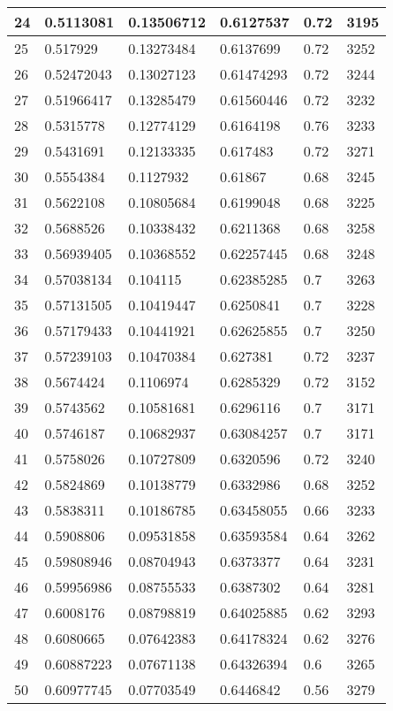 \begin{longtable}{|l|l|l|l|l|l|}
24 & 0.5113081 & 0.13506712 & 0.6127537 & 0.72 & 3195 \\ \hline 
25 & 0.517929 & 0.13273484 & 0.6137699 & 0.72 & 3252 \\ \hline 
26 & 0.52472043 & 0.13027123 & 0.61474293 & 0.72 & 3244 \\ \hline 
27 & 0.51966417 & 0.13285479 & 0.61560446 & 0.72 & 3232 \\ \hline 
28 & 0.5315778 & 0.12774129 & 0.6164198 & 0.76 & 3233 \\ \hline 
29 & 0.5431691 & 0.12133335 & 0.617483 & 0.72 & 3271 \\ \hline 
30 & 0.5554384 & 0.1127932 & 0.61867 & 0.68 & 3245 \\ \hline 
31 & 0.5622108 & 0.10805684 & 0.6199048 & 0.68 & 3225 \\ \hline 
32 & 0.5688526 & 0.10338432 & 0.6211368 & 0.68 & 3258 \\ \hline 
33 & 0.56939405 & 0.10368552 & 0.62257445 & 0.68 & 3248 \\ \hline 
34 & 0.57038134 & 0.104115 & 0.62385285 & 0.7 & 3263 \\ \hline 
35 & 0.57131505 & 0.10419447 & 0.6250841 & 0.7 & 3228 \\ \hline 
36 & 0.57179433 & 0.10441921 & 0.62625855 & 0.7 & 3250 \\ \hline 
37 & 0.57239103 & 0.10470384 & 0.627381 & 0.72 & 3237 \\ \hline 
38 & 0.5674424 & 0.1106974 & 0.6285329 & 0.72 & 3152 \\ \hline 
39 & 0.5743562 & 0.10581681 & 0.6296116 & 0.7 & 3171 \\ \hline 
40 & 0.5746187 & 0.10682937 & 0.63084257 & 0.7 & 3171 \\ \hline 
41 & 0.5758026 & 0.10727809 & 0.6320596 & 0.72 & 3240 \\ \hline 
42 & 0.5824869 & 0.10138779 & 0.6332986 & 0.68 & 3252 \\ \hline 
43 & 0.5838311 & 0.10186785 & 0.63458055 & 0.66 & 3233 \\ \hline 
44 & 0.5908806 & 0.09531858 & 0.63593584 & 0.64 & 3262 \\ \hline 
45 & 0.59808946 & 0.08704943 & 0.6373377 & 0.64 & 3231 \\ \hline 
46 & 0.59956986 & 0.08755533 & 0.6387302 & 0.64 & 3281 \\ \hline 
47 & 0.6008176 & 0.08798819 & 0.64025885 & 0.62 & 3293 \\ \hline 
48 & 0.6080665 & 0.07642383 & 0.64178324 & 0.62 & 3276 \\ \hline 
49 & 0.60887223 & 0.07671138 & 0.64326394 & 0.6 & 3265 \\ \hline 
50 & 0.60977745 & 0.07703549 & 0.6446842 & 0.56 & 3279 \\ \hline 
\end{longtable}
